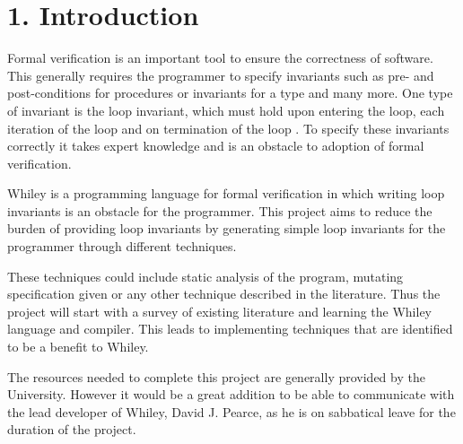 \documentclass[11pt, a4paper, twoside, openright]{report}
\begin{document}
\section*{1. Introduction}

%
%

Formal verification is an important tool to ensure the correctness of software.
This generally requires the programmer to specify invariants such as
pre- and post-conditions for procedures or invariants for a type and many more.
One type of invariant is the loop invariant,
which must hold upon entering the loop, each iteration of the loop 
and on termination of the loop \cite{invarints-classifiction}.
To specify these invariants correctly it takes expert knowledge and is an obstacle
to adoption of formal verification.

Whiley is a programming language for formal verification in
which writing loop invariants is an obstacle for the programmer.
This project aims to reduce the burden of providing loop invariants by generating
simple loop invariants for the programmer through different techniques.

These techniques could include static analysis of the program, mutating specification
given or any other technique described in the literature. Thus the project
will start with a survey of existing literature and learning the Whiley language
and compiler. This leads to implementing techniques that are identified to be a
benefit to Whiley.

The resources needed to complete this project are generally provided by the University.
However it would be a great addition to be able to communicate with the lead developer
of Whiley, David J. Pearce, as he is on sabbatical leave for the duration
of the project.
\end{document}
